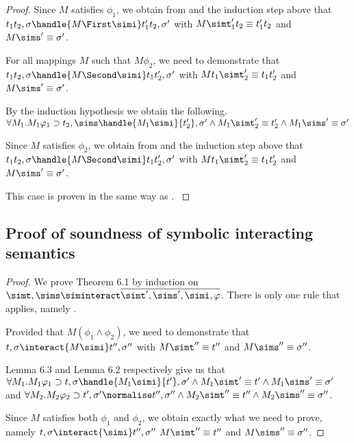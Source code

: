 \begin{proof}
{   Since $M$ satisfies $\phi_1$, we obtain from  and the induction step above that
   $t_1\And t_2,\sigma\handle{M\First \simi}t_1'\And t_2,\sigma'$ with
   $M \simt_1'\And t_2\equiv {t_1'}\And t_2$ and $M\sims'\equiv {\sigma'}$.


   For all mappings $M$ such that $M\phi_2$, we need to demonstrate that
   $t_1\And t_2,\sigma\handle{M\Second \simi}t_1\And t_2',\sigma'$ with
   $M t_1\And \simt_2'\equiv t_1\And t_2'$ and $M\sims'\equiv {\sigma'}$.

  By the induction hypothesis we obtain the following.
  $\forall M_1 . M_1 \phi_1 \implies t_2,\sims \handle{M_1 \simi} {t_2'},{\sigma'}\land M_1 \simt_2'\equiv{t_2'}\land M_1\sims' \equiv {\sigma'}$

  Since $M$ satisfies $\phi_2$, we obtain from  and the induction step above that
  $t_1\And t_2,\sigma\handle{M\Second \simi}t_1\And t_2',\sigma'$ with
  $M t_1\And \simt_2'\equiv t_1\And t_2'$ and $M\sims'\equiv {\sigma'}$.
  }

  {This case is proven in the same way as .
  }


\end{proof}


\subsection{Proof of soundness of symbolic interacting semantics}
\begin{proof}
  We prove Theorem 6.1 by induction on $\simt,\sims\siminteract \overline{\simt',
  \sims',\simi,\phi}$.
  There is only one rule that applies, namely
  .

  Provided that $M(\phi_1\land\phi_2)$, we need to demonstrate that
  $t,\sigma\interact{M\simi}t'',\sigma''$ with
  $M \simt'' \equiv {t''}$ and $M\sims''\equiv {\sigma''}$.


  Lemma 6.3 and Lemma 6.2 respectively give us that\\
$\forall M_1 . M_1 \phi_1 \implies t,\sigma \handle{M_1 \simi} {t'},{\sigma'}\land M_1 \simt'\equiv{t'}\land M_1\sims' \equiv {\sigma'}$ and
$\forall M_2 . M_2 \phi_2 \implies t',\sigma' {\normalise} {t''},{\sigma''}\land M_2 \simt''\equiv{t''}\land M_2\sims'' \equiv {\sigma''}$.

Since $M$ satisfies both $\phi_1$ and $\phi_2$,
we obtain exactly what we need to prove,
namely
$t,\sigma\interact{\simi}t'',\sigma''$
$M \simt'' \equiv {t''}$ and $M\sims''\equiv {\sigma''}$.

\end{proof}
